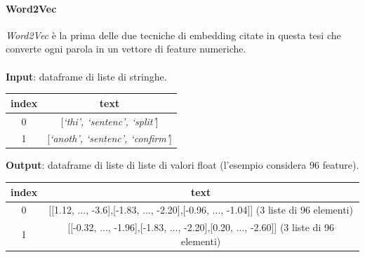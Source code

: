 \documentclass[12pt]{report}
\theoremstyle{definition}
\begin{document}
\paragraph{Word2Vec}
\textit{Word2Vec} è la prima delle due tecniche di embedding citate in questa tesi che converte ogni parola in un vettore di feature numeriche.
\\
\\
\textbf{Input}: dataframe di liste di stringhe.
\begin{center}
    \begin{tabular}{|c|c|}
    \hline
    \textbf{index} & \textbf{text} \\
    \hline
         0 & [\textit{`thi', `sentenc', `split'}]\\
         1 & [\textit{`anoth', `sentenc', `confirm'}]\\
    \hline
    \end{tabular}
\end{center}
\textbf{Output}: dataframe di liste di liste di valori float (l'esempio considera 96 feature).
\begin{center}
    \begin{tabular}{|c|c|}
    \hline
    \textbf{index} & \textbf{text} \\
    \hline
         0 & [[1.12, ..., -3.6],[-1.83, ..., -2.20],[-0.96, ..., -1.04]] (3 liste di 96 elementi) \\
         1 & [[-0.32, ..., -1.96],[-1.83, ..., -2.20],[0.20, ..., -2.60]] (3 liste di 96 elementi)\\
    \hline
    \end{tabular}
\end{center}
\end{document}
